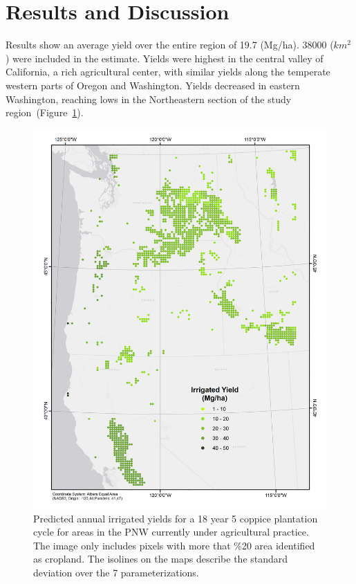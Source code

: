 \documentclass[preprint,12pt]{elsarticle}
\begin{document}
\section{Results and Discussion}
 Results show an average yield over the entire region of 19.7 (Mg/ha).
 38000 ($km^2$) were included in the estimate.  Yields were highest in the central valley
of California, a rich agricultural center, with similar yields along
the temperate western parts of Oregon and Washington.  Yields
decreased in eastern Washington, reaching lows in the Northeastern
section of the study region~(Figure~\ref{fig:irrigated_yield}).

\begin{figure}[hp]
  \centering
  \includegraphics[width=1.0\linewidth]{irrigated_yield}
  \caption{Predicted annual irrigated yields for a 18 year 5 coppice plantation cycle for areas in the \ac{PNW} currently under agricultural practice.  The image only includes pixels with more that \%20 area identified as cropland.  The isolines on the maps describe the standard deviation over the 7 parameterizations.}
  \label{fig:irrigated_yield}
\end{figure}
\end{document}
